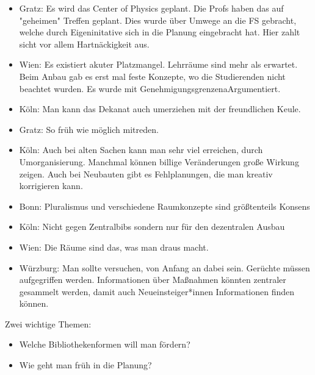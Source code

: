 \begin{itemize}
      \item Gratz: Es wird das Center of Physics geplant. Die Profs haben das auf "geheimen" Treffen geplant. Dies wurde über Umwege an die FS gebracht, welche durch Eigeninitative sich in die Planung eingebracht hat. Hier zahlt sicht vor allem Hartnäckigkeit aus.

      \item Wien: Es existiert akuter Platzmangel. Lehrräume sind mehr als erwartet. Beim Anbau gab es erst mal feste Konzepte, wo die Studierenden nicht beachtet wurden. Es wurde mit GenehmigungsgrenzenaArgumentiert.

      \item Köln: Man kann das Dekanat auch umerziehen mit der freundlichen Keule.

      \item Gratz: So früh wie möglich mitreden.

      \item Köln: Auch bei alten Sachen kann man sehr viel erreichen, durch Umorganisierung. Manchmal können billige Veränderungen große Wirkung zeigen. Auch bei Neubauten gibt es Fehlplanungen, die man kreativ korrigieren kann.

      \item Bonn: Pluralismus und verschiedene Raumkonzepte sind größtenteils Konsens

      \item Köln: Nicht gegen Zentralbibs sondern nur für den dezentralen Ausbau

      \item Wien: Die Räume sind das, was man draus macht.

      \item Würzburg: Man sollte versuchen, von Anfang an dabei sein. Gerüchte müssen aufgegriffen werden. Informationen über Maßnahmen könnten zentraler gesammelt werden, damit auch Neueinsteiger*innen Informationen finden können.
    \end{itemize}

      Zwei wichtige Themen:
      \begin{itemize}
        \item Welche Bibliothekenformen will man fördern?
        \item Wie geht man früh in die Planung?
      \end{itemize}

